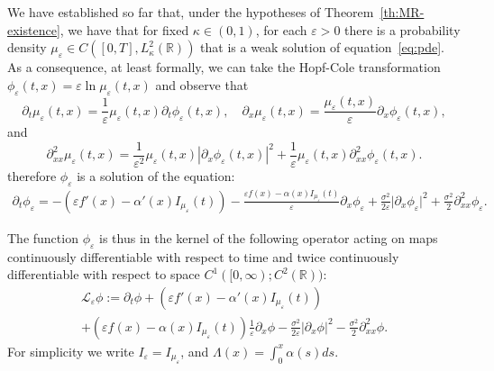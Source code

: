 \documentclass[onefignum,onetabnum]{siamart190516}
\newcommand{\R}{\mathbb{R}}
\newcommand{\1}{\mathbbm{1}}
\newcommand{\eps}{\varepsilon}
\begin{document}
We have established so far that, under the hypotheses of Theorem~\ref{th:MR-existence}, we have that for fixed $\kappa\in(0,1)$, for each $\eps>0$ there is a probability density $\mu_{\eps}\in C([0,T],L^2_\kappa(\R))$ that is a weak solution of equation~\eqref{eq:pde}. As a consequence, at least formally, we can take the Hopf-Cole transformation $\phi_\eps(t,x)=\eps\ln\mu_\eps(t,x)$ and observe that
$$
\partial_t\mu_\eps(t,x) =\frac{1}{\eps}\mu_\eps(t,x)\partial_t\phi_\eps(t,x),\quad \partial_x\mu_\eps(t,x) = \frac{\mu_\eps(t,x)}{\eps}\partial_x\phi_\eps(t,x),
$$
and
$$
\partial^2_{xx}\mu_\eps(t,x)= \frac1{\eps^2}\mu_\eps(t,x)|\partial_x\phi_\eps(t,x)|^2+\frac1{\eps}\mu_\eps(t,x)\partial^2_{xx}\phi_\eps(t,x).
$$
therefore $\phi_\eps$ is a solution of the equation:
\begin{multline}
\partial_t\phi_\eps = -\left(\eps f'(x) - \alpha'(x)I_{\mu_\eps}(t) \right)
-  \frac{\eps f(x)- \alpha(x) I_{\mu_\eps}(t)}{\eps}\partial_x\phi_\eps + \frac{\sigma^2}{2\eps} \vert \partial_x \phi_\eps \vert^2  + \frac {\sigma^2}{2} \partial_{xx}^2 \phi_\eps.
\label{eq:hopfcole}
\end{multline}
%
%

The function $\phi_\eps$ is thus in the kernel of the following operator acting on maps continuously differentiable with respect to time and twice continuously differentiable with respect to space $C^1([0,\infty);C^2(\R))$:
\begin{multline*}
\mathcal L_\eps\phi:=\partial_t\phi +\left(\eps f'(x) - \alpha'(x)I_{\mu_\eps}(t) \right)
\\
+  \left(\eps f(x)- \alpha(x) I_{\mu_\eps}(t)\right)\frac{1}{\eps}\partial_x\phi - \frac{\sigma^2}{2\eps} \vert \partial_x \phi \vert^2  - \frac {\sigma^2}{2} \partial_{xx}^2 \phi.
\end{multline*}
For simplicity we write $I_\eps=I_{\mu_\eps}$, and $\Lambda(x)=\int_0^x\alpha(s)ds$. 
\end{document}
